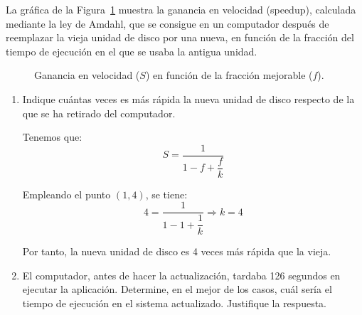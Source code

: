\begin{comment}
SOLUCIÓN: Se empleaba el 85\% del tiempo de ejecución. La ganancia en velocidad obtenida con el nuevo procesador es $S = 2,3$.
\end{comment}

\begin{ejercicio}
La gráfica de la Figura~\ref{fig:1_12} muestra la ganancia en velocidad (speedup), calculada mediante la ley de Amdahl, que se consigue en un computador después de reemplazar la vieja unidad de disco por una nueva, en función de la fracción del tiempo de ejecución en el que se usaba la antigua unidad.
\begin{figure}
    \centering
    \caption{Ganancia en velocidad ($S$) en función de la fracción mejorable ($f$).}
    \label{fig:1_12}
\end{figure}
\begin{enumerate}
    \item Indique cuántas veces es más rápida la nueva unidad de disco respecto de la que se ha retirado del computador.
    
    Tenemos que:
    \begin{equation*}
        S = \dfrac{1}{1-f+\dfrac{f}{k}}
    \end{equation*}

    Empleando el punto $(1,4)$, se tiene:
    \begin{equation*}
        4 = \dfrac{1}{1-1+\dfrac{1}{k}}\Longrightarrow k = 4
    \end{equation*}

    Por tanto, la nueva unidad de disco es 4 veces más rápida que la vieja.
    \item El computador, antes de hacer la actualización, tardaba 126 segundos en ejecutar la aplicación. Determine, en el mejor de los casos, cuál sería el tiempo de ejecución en el sistema actualizado. Justifique la respuesta.
    

\end{enumerate}
\end{ejercicio}
